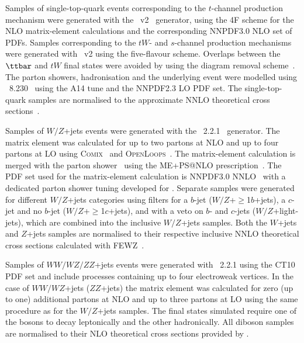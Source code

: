 \documentclass[PAPER, coverpage, atlasdraft=true, texlive=2016, UKenglish]{\ATLASLATEXPATH atlasdoc}
\begin{document}
Samples of single-top-quark events corresponding to the $t$-channel production mechanism were generated with the 
{\powheg}~v2~\cite{Frederix:2012dh} generator, using the 4F scheme  for the NLO matrix-element calculations
and the corresponding NNPDF3.0 NLO set of PDFs.
Samples corresponding to the $tW$- and $s$-channel production mechanisms were generated 
with {\powheg}~v2 using the five-flavour scheme. Overlaps between the $\ttbar$ and $tW$ final states were avoided by using 
the diagram removal scheme~\cite{Frixione:2005vw}.
The parton showers, hadronisation and the underlying event were modelled using {\pythia}~8.230~\cite{Sjostrand:2006za} using the A14 tune and the NNPDF2.3 LO PDF set.
The single-top-quark samples are normalised to the approximate NNLO theoretical cross 
sections~\cite{Kidonakis:2011wy,Kidonakis:2010ux,Kidonakis:2010tc}. 

Samples of $W/Z$+jets events were generated with the {\sherpa}~2.2.1~\cite{Gleisberg:2008ta} generator. 
The matrix element was calculated for up to two partons at NLO and up to four partons at LO using 
\textsc{Comix}~\cite{Gleisberg:2008fv} and \textsc{OpenLoops}~\cite{Cascioli:2011va}. The matrix-element calculation 
is merged with the {\sherpa} parton shower~\cite{Schumann:2007mg} using the ME+PS@NLO prescription~\cite{Hoeche:2012yf}. 
The PDF set used for the matrix-element calculation is NNPDF3.0 NNLO~\cite{Ball:2014uwa} with a dedicated parton shower tuning developed for {\sherpa}. 
Separate samples were generated for different $W/Z$+jets categories using filters for a $b$-jet 
($W/Z$+$\geq$1$b$+jets), a $c$-jet and no $b$-jet ($W/Z$+$\geq$1$c$+jets), and with a veto on $b$- and $c$-jets 
($W/Z$+light-jets), which are combined into the inclusive $W/Z$+jets samples.
Both the $W$+jets and $Z$+jets samples are normalised to their respective inclusive NNLO theoretical 
cross sections calculated with \textsc{FEWZ}~\cite{Anastasiou:2003ds}.

Samples of $WW/WZ/ZZ$+jets events were generated with {\sherpa}~2.2.1 using the CT10 PDF set
and include processes containing up to four electroweak vertices. 
In the case of $WW/WZ$+jets ($ZZ$+jets) the matrix element was calculated for zero (up to one) additional partons 
at NLO and up to three partons at LO using the same procedure as for the $W/Z$+jets samples. 
The final states simulated require one of the bosons to decay leptonically and the other hadronically.
All diboson samples are normalised to their NLO theoretical cross sections provided by {\sherpa}. 
\end{document}
